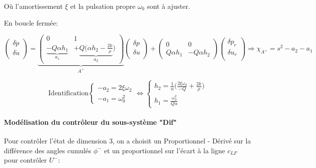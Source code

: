 \documentclass{report}
\begin{document}
Où l'amortissement $\xi$ et la pulsation propre $\omega_0$ sont à ajuster.

En boucle fermée:

\begin{equation*}
    \begin{pmatrix}
        \delta{\dot p} \\
        \delta{\dot u} \\
    \end{pmatrix}
    =
    \underbrace{
    \begin{pmatrix}
        0 & 1 \\
        \underbrace{-Q\alpha h_1}_{a_1} & +\underbrace{Q(\alpha h_2 - \frac{2k}{\rho}}_{a_2})
    \end{pmatrix}
    }_{A^+}
    \begin{pmatrix}
        \delta{p} \\
        \delta{u} \\
    \end{pmatrix}
    +
    \begin{pmatrix}
        0 & 0 \\
        Q\alpha h_1 & -Q\alpha h_2
    \end{pmatrix}
    \begin{pmatrix}
        \delta{p_r} \\
        \delta{u_r} \\
    \end{pmatrix}
    \Rightarrow
    \chi_{A^+} = s^2 - a_2 - a_1
\end{equation*}


\begin{equation*}
    \text{Identification}
    \begin{cases}
        -a_2=2\xi \omega_2 \\
        -a_1 = \omega_0^2
    \end{cases}
    \Leftrightarrow
    \begin{cases}
        h_2 = \frac{1}{\alpha}\big( \frac{2\xi\omega_0}{-Q}+\frac{2k}{\rho})\\
        h_1 = \frac{\omega_0^2}{Q\alpha}
    \end{cases}
\end{equation*}

\paragraph{Modélisation du contrôleur du sous-système "Dif"}
Pour contrôler l'état de dimension 3, on a choisit un Proportionnel - Dérivé
sur la différence des angles cumulés $\phi^-$ 
et un proportionnel sur l'écart à la ligne $c_{LF}$ pour contrôler $U^-$:
\end{document}
